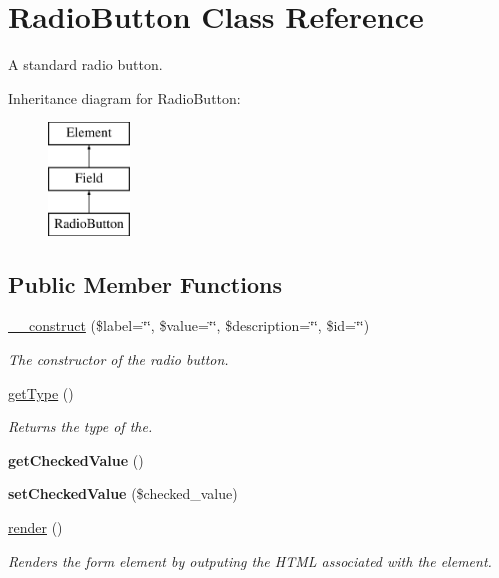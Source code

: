 \hypertarget{class_radio_button}{
\section{RadioButton Class Reference}
\label{class_radio_button}
}


A standard radio button.  


Inheritance diagram for RadioButton:\begin{figure}[H]
\begin{center}
\leavevmode
\includegraphics[height=3.000000cm]{class_radio_button}
\end{center}
\end{figure}
\subsection*{Public Member Functions}
\begin{DoxyCompactItemize}
\item 
\hyperlink{class_radio_button_abec6660de0b22e6e6f22a7ac9b6007a8}{\_\-\_\-construct} (\$label=\char`\"{}\char`\"{}, \$value=\char`\"{}\char`\"{}, \$description=\char`\"{}\char`\"{}, \$id=\char`\"{}\char`\"{})
\begin{DoxyCompactList}\small\item\em The constructor of the radio button. \item\end{DoxyCompactList}\item 
\hyperlink{class_radio_button_a96e5af180b0f6abd92dcbc2b70252a13}{getType} ()
\begin{DoxyCompactList}\small\item\em Returns the type of the. \item\end{DoxyCompactList}\item 
\hypertarget{class_radio_button_a024672f0a7bc73cf15d0fac1183e9167}{
{\bfseries getCheckedValue} ()}
\label{class_radio_button_a024672f0a7bc73cf15d0fac1183e9167}

\item 
\hypertarget{class_radio_button_a884291ef2a33fa46e7b0cdc626e5b887}{
{\bfseries setCheckedValue} (\$checked\_\-value)}
\label{class_radio_button_a884291ef2a33fa46e7b0cdc626e5b887}

\item 
\hyperlink{class_radio_button_a8b6b7f1918c8e0f152cc611c59e603c2}{render} ()
\begin{DoxyCompactList}\small\item\em Renders the form element by outputing the HTML associated with the element. \item\end{DoxyCompactList}\end{DoxyCompactItemize}
